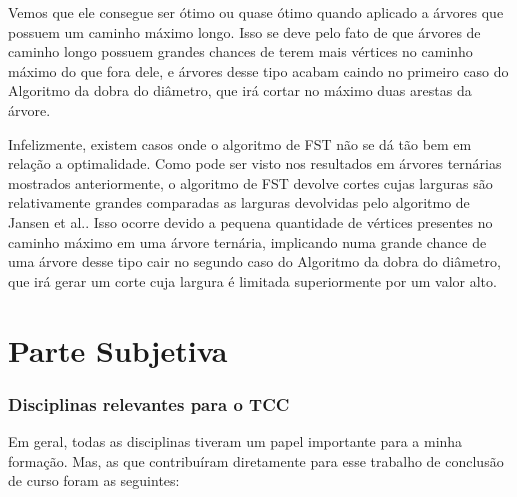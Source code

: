 \documentclass[a4paper,12pt]{article}
\begin{document}
Vemos que ele consegue ser ótimo ou quase ótimo quando aplicado
a árvores que possuem um caminho máximo longo. 
Isso se deve pelo
fato de que árvores de caminho longo possuem grandes chances
de terem mais vértices no caminho máximo do que fora dele, e
árvores desse tipo acabam caindo no primeiro caso do Algoritmo da 
dobra do diâmetro, que irá cortar no máximo duas arestas da árvore.

Infelizmente, existem casos onde o algoritmo de FST não se dá
tão bem em relação a optimalidade.
Como pode ser visto nos resultados em árvores ternárias mostrados 
anteriormente,
o algoritmo de FST devolve cortes cujas larguras são relativamente
grandes comparadas as larguras devolvidas pelo algoritmo de Jansen
et al.. 
Isso ocorre devido a pequena quantidade de vértices presentes 
no caminho máximo em uma árvore ternária, 
implicando numa grande chance de uma árvore desse tipo cair 
no segundo caso
do Algoritmo da dobra do diâmetro, que irá gerar um corte
cuja largura é
limitada superiormente por um valor alto.

\newpage



\newpage

\part{Parte Subjetiva}
\newpage


\section{Disciplinas relevantes para o TCC}
Em geral, todas as disciplinas tiveram um papel importante
para a minha formação. Mas, as que contribuíram
diretamente para esse trabalho de conclusão de curso
 foram as seguintes:
\end{document}
